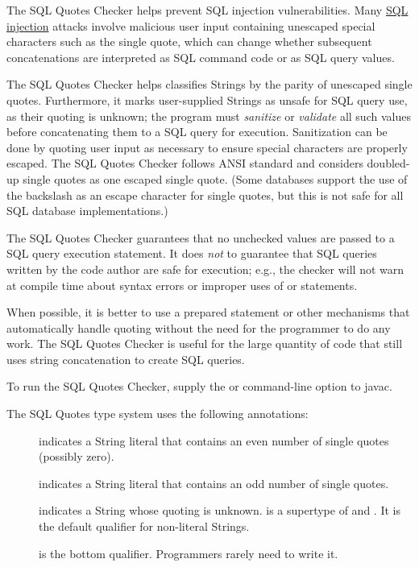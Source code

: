 \htmlhr
{}

The SQL Quotes Checker helps prevent SQL injection vulnerabilities. Many
\href{https://en.wikipedia.org/wiki/Sql_injection}{SQL injection} attacks
involve malicious user input containing unescaped special characters such as the
single quote, which can change whether subsequent concatenations are interpreted
as SQL command code or as SQL query values. 

The SQL Quotes Checker helps classifies Strings by the parity of unescaped
single quotes.  Furthermore, it marks user-supplied Strings as unsafe for
SQL query use, as their quoting is unknown; the program must
\emph{sanitize} or \emph{validate} all such values before concatenating
them to a SQL query for execution. Sanitization can be done by quoting user
input as necessary to ensure special characters are properly escaped.  The
SQL Quotes Checker follows ANSI standard and considers doubled-up single
quotes as one escaped single quote.  (Some databases support the use of the
backslash as an escape character for single quotes, but this is not safe
for all SQL database implementations.)

The SQL Quotes Checker guarantees that no unchecked values are passed to a
SQL query execution statement.  It does \emph{not} to guarantee that SQL
queries written by the code author are safe for execution; e.g., the
checker will not warn at compile time about syntax errors or improper uses
of  or  statements.

When possible, it is better to use a prepared statement or other mechanisms
that automatically handle quoting without the need for the programmer to do
any work.  The SQL Quotes Checker is useful for the large quantity of code
that still uses string concatenation to create SQL queries.

To run the SQL Quotes Checker, supply the
or
command-line option to javac.



The SQL Quotes type system uses the following annotations:

\begin{description}
\item[]
    indicates a String literal that contains an even number of
    single quotes (possibly zero).
\item[]
    indicates a String literal that contains an odd number of single
    quotes.
\item[]
    indicates a String whose quoting is unknown.
     is a supertype of 
    and . It is the default qualifier for non-literal
    Strings.
\item[]
    is the bottom qualifier.  Programmers rarely need to write it.
\end{description}

